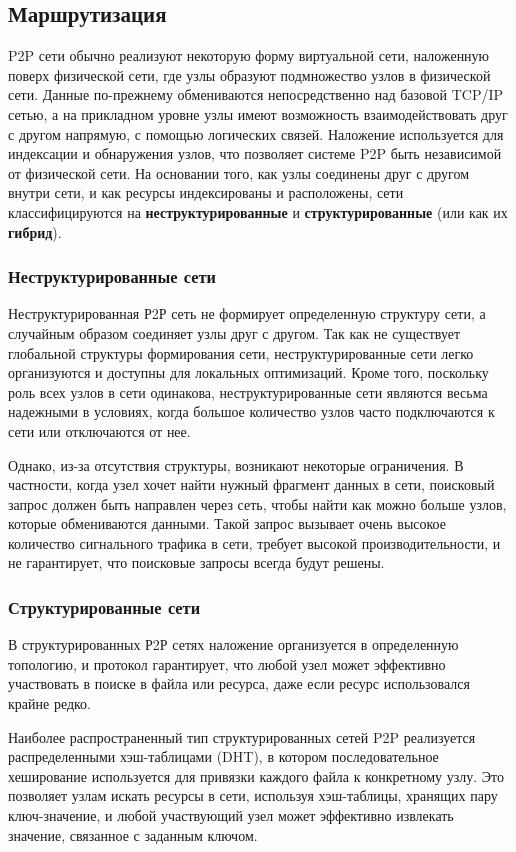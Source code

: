 \documentclass[bachelor, och, coursework]{SCWorks}
\begin{document}
\subsection{Маршрутизация}
P2P сети обычно реализуют некоторую форму виртуальной сети, наложенную поверх физической сети, где узлы образуют подмножество узлов в физической сети. Данные по-прежнему обмениваются непосредственно над базовой TCP/IP сетью, а на прикладном уровне узлы имеют возможность взаимодействовать друг с другом напрямую, с помощью логических связей. Наложение используется для индексации и обнаружения узлов, что позволяет системе P2P быть независимой от физической сети. На основании того, как узлы соединены друг с другом внутри сети, и как ресурсы индексированы и расположены, сети классифицируются на \textbf{неструктурированные} и \textbf{структурированные} (или как их \textbf{гибрид}).

\subsubsection{Неструктурированные сети}
Неструктурированная Р2Р сеть не формирует определенную структуру сети, а случайным образом соединяет узлы друг с другом. Так как не существует глобальной структуры формирования сети, неструктурированные сети легко организуются и доступны для локальных оптимизаций. Кроме того, поскольку роль всех узлов в сети одинакова, неструктурированные сети являются весьма надежными в условиях, когда большое количество узлов часто подключаются к сети или отключаются от нее.

Однако, из-за отсутствия структуры, возникают некоторые ограничения. В частности, когда узел хочет найти нужный фрагмент данных в сети, поисковый запрос должен быть направлен через сеть, чтобы найти как можно больше узлов, которые обмениваются данными. Такой запрос вызывает очень высокое количество сигнального трафика в сети, требует высокой производительности, и не гарантирует, что поисковые запросы всегда будут решены.

\subsubsection{Структурированные сети}
В структурированных Р2Р сетях наложение организуется в определенную топологию, и протокол гарантирует, что любой узел может эффективно участвовать в поиске в файла или ресурса, даже если ресурс использовался крайне редко.

Наиболее распространенный тип структурированных сетей P2P реализуется распределенными хэш-таблицами (DHT), в котором последовательное хеширование используется для привязки каждого файла к конкретному узлу. Это позволяет узлам искать ресурсы в сети, используя хэш-таблицы, хранящих пару ключ-значение, и любой участвующий узел может эффективно извлекать значение, связанное с заданным ключом.
\end{document}
